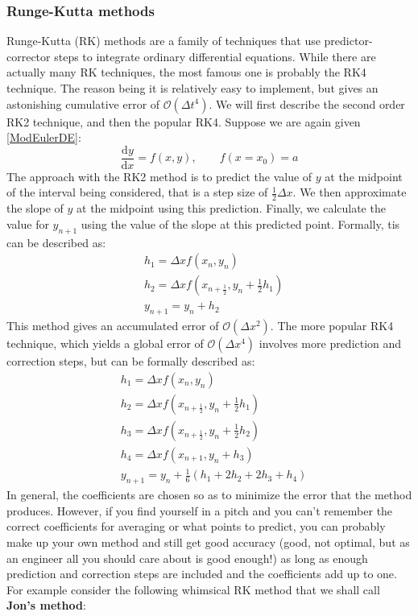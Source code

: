 \documentclass[]{article}
\theoremstyle{definition}
\numberwithin{equation}{section}
\begin{document}
	\subsubsection{Runge-Kutta methods}
		Runge-Kutta (RK) methods are a family of techniques that use predictor-corrector steps to integrate ordinary differential equations. While there are actually many RK techniques, the most famous one is probably the RK4 technique. The reason being it is relatively easy to implement, but gives an astonishing cumulative error of $\mathcal{O}(\Delta t^4)$. We will first describe the second order RK2 technique, and then the popular RK4. Suppose we are again given \eqref{ModEulerDE}:
			\begin{equation}
		\frac{\text{d}y}{\text{d}x} = f(x,y) , \qquad f(x=x_0) = a \label{ModEulerDE2}
		\end{equation}
		The approach with the RK2 method is to predict the value of $y$ at the midpoint of the interval being considered, that is a step size of $ \frac{1}{2} \Delta x$. We then approximate the slope of $y$ at the midpoint using this prediction. Finally, we calculate the value for $y_{n+1}$ using the value of the slope at this predicted point. Formally, tis can be described as:
		\begin{align*}
			&h_1 = \Delta x f(x_n,y_n) \\
			&h_2 = \Delta x f(x_{n+\frac{1}{2}}, y_n + \frac{1}{2}h_1)\\
			&y_{n+1} = y_n + h_2
		\end{align*}
		This method gives an accumulated error of $\mathcal{O}(\Delta x^2)$. The more popular RK4 technique, which yields a global error of $\mathcal{O}(\Delta x^4)$ involves more prediction and correction steps, but can be formally described as:
		\begin{align*}
			& h_1 = \Delta x f(x_n,y_n) \\
			& h_2 = \Delta x f(x_{n+\frac{1}{2}},y_n + \frac{1}{2}h_1) \\
			& h_3 = \Delta x f(x_{n+\frac{1}{2}}, y_n + \frac{1}{2}h_2) \\
			& h_4 = \Delta x f(x_{n+1}, y_n + h_3) \\
			& y_{n+1} = y_n + \frac{1}{6} \left(h_1 + 2h_2 + 2h_3 + h_4\right)
		\end{align*}
		In general, the coefficients are chosen so as to minimize the error that the method produces. However, if you find yourself in a pitch and you can't remember the correct coefficients for averaging or what points to predict, you can probably make up your own method and still get good accuracy (good, not optimal, but as an engineer all you should care about is good enough!) as long as enough prediction and correction steps are included and the coefficients add up to one. For example consider the following whimsical RK method that we shall call \textbf{Jon's method}:
\end{document}
